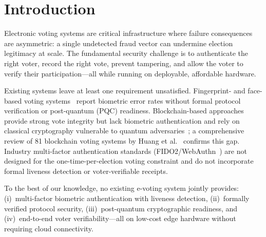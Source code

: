 \documentclass[submission]{sacjsub}
\begin{document}


\SACJmaketitle

\section{Introduction}\label{sec:intro}

Electronic voting systems are critical infrastructure where failure
consequences are asymmetric: a single undetected fraud vector can
undermine election legitimacy at scale. The fundamental security
challenge is to authenticate the right voter, record the right vote,
prevent tampering, and allow the voter to verify their
participation---all while running on deployable, affordable hardware.

Existing systems leave at least one requirement unsatisfied.
Fingerprint- and face-based voting
systems~\cite{bello2021biometric,sanchez2020biometric,komatineni2020biometric,nagaraj2022voting}
report biometric error rates without formal protocol verification or
post-quantum (PQC) readiness. Blockchain-based
approaches~\cite{ayed2017conceptual,hardwick2018voting,faruk2024transforming}
provide strong vote integrity but lack biometric authentication and
rely on classical cryptography vulnerable to quantum
adversaries~\cite{bernstein2017post}; a comprehensive review of 81
blockchain voting systems by Huang et al.~\cite{huang2022blockchain_voting}
confirms this gap. Industry multi-factor authentication standards
(FIDO2/WebAuthn~\cite{fido2_webauthn}) are not designed for the
one-time-per-election voting constraint and do not incorporate formal
liveness detection or voter-verifiable receipts.

To the best of our knowledge, no existing e-voting system jointly
provides: (i)~multi-factor biometric authentication with liveness
detection, (ii)~formally verified protocol security, (iii)~post-quantum
cryptographic readiness, and (iv)~end-to-end voter
verifiability---all on low-cost edge hardware without requiring cloud
connectivity.
\end{document}
